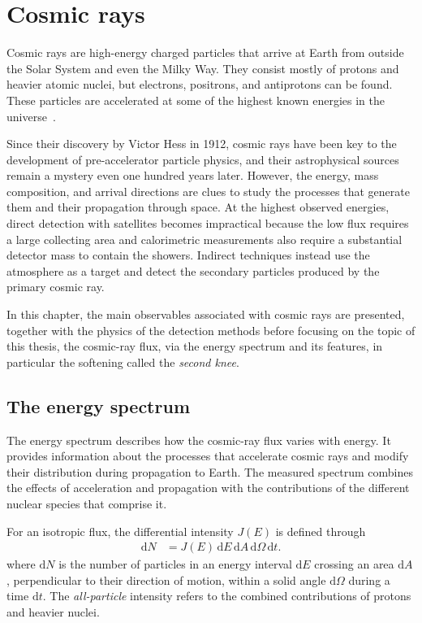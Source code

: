 \documentclass[main.tex]{subfiles}
\begin{document}
\chapter{Cosmic rays}
\label{chapter:cr}

Cosmic rays are high-energy charged particles that arrive at Earth from outside the Solar System and even the Milky Way.
They consist mostly of protons and heavier atomic nuclei, but electrons, positrons, and antiprotons can be found. These particles are accelerated at some of the highest known energies in the universe~\cite{PDG:2025:CosmicRays}.

Since their discovery by Victor Hess in 1912, cosmic rays have been key to the development of pre-accelerator particle physics, and their astrophysical sources remain a mystery even one hundred years later.
However, the energy, mass composition, and arrival directions are clues to study the processes that generate them and their propagation through space.
At the highest observed energies, direct detection with satellites becomes impractical because the low flux requires a large collecting area and calorimetric measurements also require a substantial detector mass to contain the showers.
Indirect techniques instead use the atmosphere as a target and detect the secondary particles produced by the primary cosmic ray.

In this chapter, the main observables associated with cosmic rays are presented, together with the physics of the detection methods before focusing on the topic of this thesis, the cosmic-ray flux, via the energy spectrum and its features, in particular the softening called the \textit{second knee}.

\section{The energy spectrum}
\label{sec:cr_spectrum}

The energy spectrum describes how the cosmic-ray flux varies with energy.
It provides information about the processes that accelerate cosmic rays and modify their distribution during propagation to Earth.
The measured spectrum combines the effects of acceleration and propagation with the contributions of the different nuclear species that comprise it.

For an isotropic flux, the differential intensity $J(E)$ is defined through
\begin{align}
    \mathrm{d}N &= J(E)\,\mathrm{d}E\,\mathrm{d}A\,\mathrm{d}\Omega\,\mathrm{d}t .
    \label{eq:cr_intensity}
\end{align}
\noindent where $\mathrm{d}N$ is the number of particles in an energy interval $\mathrm{d}E$ crossing an area $\mathrm{d}A$, perpendicular to their direction of motion, within a solid angle $\mathrm{d}\Omega$ during a time $\mathrm{d}t$.
The \textit{all-particle} intensity refers to the combined contributions of protons and heavier nuclei.
\end{document}
